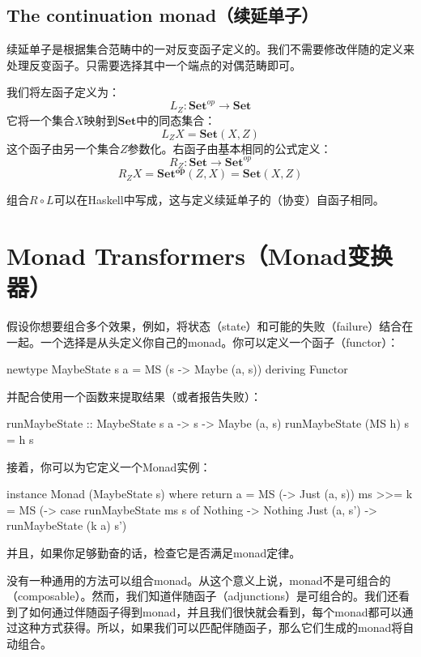 \documentclass[DaoFP]{subfiles}
\begin{document}
    \subsection{The continuation monad（续延单子）}

    续延单子是根据集合范畴中的一对反变函子定义的。我们不需要修改伴随的定义来处理反变函子。只需要选择其中一个端点的对偶范畴即可。

    我们将左函子定义为：
    \[ L_Z \colon \mathbf{Set}^{op} \to \mathbf{Set} \]
    它将一个集合$X$映射到$\mathbf{Set}$中的同态集合：
    \[ L_Z X = \mathbf{Set}(X, Z) \]
    这个函子由另一个集合$Z$参数化。右函子由基本相同的公式定义：
    \[ R_Z \colon \mathbf{Set} \to \mathbf{Set}^{op} \]
    \[ R_Z X = \mathbf{Set^{op}}(Z, X)  = \mathbf{Set}(X, Z) \]

    组合$R \circ L$可以在Haskell中写成，这与定义续延单子的（协变）自函子相同。

    \section{Monad Transformers（Monad变换器）}

    假设你想要组合多个效果，例如，将状态（state）和可能的失败（failure）结合在一起。一个选择是从头定义你自己的monad。你可以定义一个函子（functor）：
    \begin{haskell}
        newtype MaybeState s a = MS (s -> Maybe (a, s))
        deriving Functor
    \end{haskell}
    并配合使用一个函数来提取结果（或者报告失败）：
    \begin{haskell}
        runMaybeState :: MaybeState s a -> s -> Maybe (a, s)
        runMaybeState (MS h) s = h s
    \end{haskell}
    接着，你可以为它定义一个Monad实例：
    \begin{haskell}
        instance Monad (MaybeState s) where
        return a = MS (\s -> Just (a, s))
        ms >>= k = MS (\s -> case runMaybeState ms s of
        Nothing -> Nothing
        Just (a, s') -> runMaybeState (k a) s')
    \end{haskell}
    并且，如果你足够勤奋的话，检查它是否满足monad定律。

    没有一种通用的方法可以组合monad。从这个意义上说，monad不是可组合的（composable）。然而，我们知道伴随函子（adjunctions）是可组合的。我们还看到了如何通过伴随函子得到monad，并且我们很快就会看到，每个monad都可以通过这种方式获得。所以，如果我们可以匹配伴随函子，那么它们生成的monad将自动组合。
\end{document}
